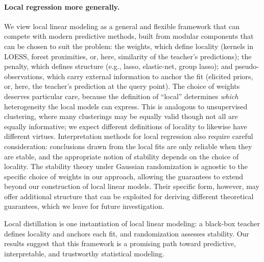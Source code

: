\documentclass[12pt]{article}
\theoremstyle{definition}
\begin{document}
\paragraph{Local regression more generally.} We view local linear modeling as a general and flexible framework that can compete with modern predictive methods, built from modular components that can be chosen to suit the problem: the weights, which define locality (kernels in LOESS, forest proximities, or, here, similarity of the teacher's predictions); the penalty, which defines structure (e.g., lasso, elastic-net, group lasso); and pseudo-observations, which carry external information to anchor the fit (elicited priors, or, here, the teacher's prediction at the query point).
The choice of weights deserves particular care, because the definition of ``local'' determines \textit{which} heterogeneity the local models can express. 
This is analogous to unsupervised clustering, where many clusterings may be equally valid though not all are equally informative; we expect different definitions of locality to likewise have different virtues. 
Interpretation methods for local regression also require careful consideration: conclusions drawn from the local fits are only reliable when they are stable, and the appropriate notion of stability depends on the choice of locality. 
The stability theory under Gaussian randomization is agnostic to the specific choice of weights in our approach, allowing the guarantees to extend beyond our construction of local linear models. 
Their specific form, however, may offer additional structure that can be exploited for deriving different theoretical guarantees, which we leave for future investigation.

Local distillation is one instantiation of local linear modeling: a black-box
teacher defines locality and anchors each fit, and randomization assesses
stability. Our results suggest that this framework is a promising path
toward predictive, interpretable, and trustworthy statistical modeling.

\end{document}
